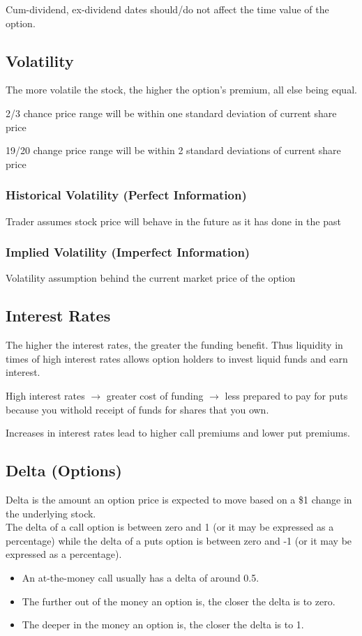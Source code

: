 \documentclass[12pt, a4paper]{article}
\begin{document}
Cum-dividend, ex-dividend dates should/do not affect the time value of the option.

\subsection*{Volatility}
The more volatile the stock, the higher the option's premium, all else being equal.

2/3 chance price range will be within one standard deviation of current share price

19/20 change price range will be within 2 standard deviations of current share price

\subsubsection*{Historical Volatility (Perfect Information)}
Trader assumes stock price will behave in the future as it has done in the past

\subsubsection*{Implied Volatility (Imperfect Information)}
Volatility assumption behind the current market price of the option

\subsection*{Interest Rates}
The higher the interest rates, the greater the funding benefit. Thus liquidity in times of
high interest rates allows option holders to invest liquid funds and earn interest.

High interest rates \(\rightarrow\) greater cost of funding \(\rightarrow\) less prepared to pay for puts because you withold
receipt of funds for shares that you own.

Increases in interest rates lead to higher call premiums and lower put premiums.

\subsection*{Delta (Options)}
Delta is the amount an option price is expected to move based on a \$1 change in the underlying stock.\\

The delta of a call option is between zero and 1 (or it may be expressed as a percentage) while the delta of a puts option is between zero and -1 (or it may be expressed as a percentage).
\begin{itemize}
    \item An at-the-money call usually has a delta of around 0.5.
    \item The further out of the money an option is, the closer the delta is to zero.
    \item The deeper in the money an option is, the closer the delta is to 1.
\end{itemize}
\end{document}
